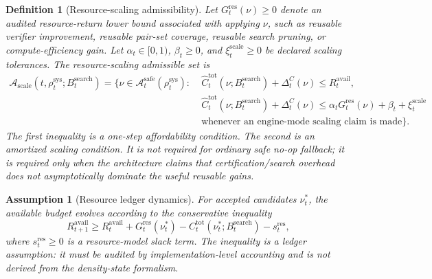 \documentclass[11pt,a4paper]{article}
\newtheorem{definition}[theorem]{Definition}
\newtheorem{assumption}[theorem]{Assumption}
\newcommand{\Acal}{\mathcal A}
\newcommand{\sys}{\mathrm{sys}}
\newcommand{\safe}{\mathrm{safe}}
\newcommand{\search}{\mathrm{search}}
\newcommand{\scale}{\mathrm{scale}}
\newcommand{\tot}{\mathrm{tot}}
\newcommand{\avail}{\mathrm{avail}}
\newcommand{\res}{\mathrm{res}}
\begin{document}
\begin{definition}[Resource-scaling admissibility]
\label{def:resource-scaling-admissibility}
Let \(G_t^{\res}(\nu)\ge0\) denote an audited resource-return lower bound associated with applying \(\nu\), such as reusable verifier improvement, reusable pair-set coverage, reusable search pruning, or compute-efficiency gain. Let \(\alpha_t\in[0,1)\), \(\beta_t\ge0\), and \(\xi_t^{\scale}\ge0\) be declared scaling tolerances. The resource-scaling admissible set is
\[
\begin{aligned}
\Acal_{\scale}(t,\rho_t^{\sys};B_t^{\search})
=
\bigl\{\nu\in\Acal_t^{\safe}(\rho_t^{\sys}):\;&
\widehat C_t^{\tot}(\nu;B_t^{\search})+\Delta_t^C(\nu)\le R_t^{\avail},\\
&
\widehat C_t^{\tot}(\nu;B_t^{\search})+\Delta_t^C(\nu)
\le \alpha_t G_t^{\res}(\nu)+\beta_t+\xi_t^{\scale}\\
&\text{whenever an engine-mode scaling claim is made}
\bigr\}.
\end{aligned}
\]
The first inequality is a one-step affordability condition. The second is an amortized scaling condition. It is not required for ordinary safe no-op fallback; it is required only when the architecture claims that certification/search overhead does not asymptotically dominate the useful reusable gains.
\end{definition}

\begin{assumption}[Resource ledger dynamics]
\label{ass:resource-ledger-dynamics}
For accepted candidates \(\nu_t^*\), the available budget evolves according to the conservative inequality
\[
R_{t+1}^{\avail}
\ge
R_t^{\avail}+G_t^{\res}(\nu_t^*)-C_t^{\tot}(\nu_t^*;B_t^{\search})-s_t^{\res},
\]
where \(s_t^{\res}\ge0\) is a resource-model slack term. The inequality is a ledger assumption: it must be audited by implementation-level accounting and is not derived from the density-state formalism.
\end{assumption}
\end{document}
